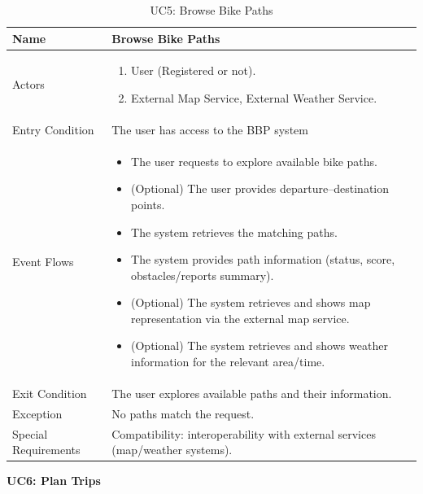 \begin{table}[H]
    \centering
    \renewcommand{\arraystretch}{1.3}
    \begin{tabular}{|p{}|p{}|}
        \hline
        Name & \textbf{Browse Bike Paths} \\
        \hline
        Actors & \begin{enumerate}[topsep=0pt, partopsep=0pt, leftmargin=*]
            \item User (Registered or not).
            \item External Map Service, External Weather Service.
        \end{enumerate} \\
        \hline
        Entry Condition & The user has access to the BBP system \\
        \hline
        Event Flows & \begin{itemize}[topsep=0pt, partopsep=0pt, leftmargin=*]
            \item The user requests to explore available bike paths.
            \item (Optional) The user provides departure–destination points.
            \item The system retrieves the matching paths.
            \item The system provides path information (status, score, obstacles/reports summary).
            \item (Optional) The system retrieves and shows map representation via the external map service.
            \item (Optional) The system retrieves and shows weather information for the relevant area/time.
        \end{itemize} \\
        \hline
        Exit Condition & The user explores available paths and their information. \\
        \hline
        Exception & No paths match the request. \\
        \hline
        Special Requirements & Compatibility: interoperability with external services (map/weather systems). \\
        \hline
    \end{tabular}
    \caption{UC5: Browse Bike Paths}
    \label{uc5}
\end{table}

\newpage
\noindent
\textbf{UC6: Plan Trips}

